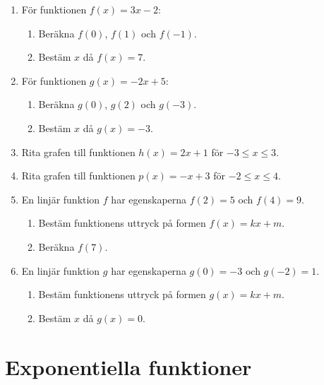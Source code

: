 \documentclass[a4paper,11pt]{article}
\begin{document}
\begin{enumerate}[label=\textbf{\arabic*.}]
    \item För funktionen $f(x) = 3x - 2$:
    \begin{enumerate}[label=\alph*)]
        \item Beräkna $f(0)$, $f(1)$ och $f(-1)$.
        \item Bestäm $x$ då $f(x) = 7$.
    \end{enumerate}
    
    \item För funktionen $g(x) = -2x + 5$:
    \begin{enumerate}[label=\alph*)]
        \item Beräkna $g(0)$, $g(2)$ och $g(-3)$.
        \item Bestäm $x$ då $g(x) = -3$.
    \end{enumerate}
    
    \item Rita grafen till funktionen $h(x) = 2x + 1$ för $-3 \leq x \leq 3$.
    
    \item Rita grafen till funktionen $p(x) = -x + 3$ för $-2 \leq x \leq 4$.
    
    \item En linjär funktion $f$ har egenskaperna $f(2) = 5$ och $f(4) = 9$.
    \begin{enumerate}[label=\alph*)]
        \item Bestäm funktionens uttryck på formen $f(x) = kx + m$.
        \item Beräkna $f(7)$.
    \end{enumerate}
    
    \item En linjär funktion $g$ har egenskaperna $g(0) = -3$ och $g(-2) = 1$.
    \begin{enumerate}[label=\alph*)]
        \item Bestäm funktionens uttryck på formen $g(x) = kx + m$.
        \item Bestäm $x$ då $g(x) = 0$.
    \end{enumerate}
\end{enumerate}

\newpage
\section*{Exponentiella funktioner}
\end{document}
